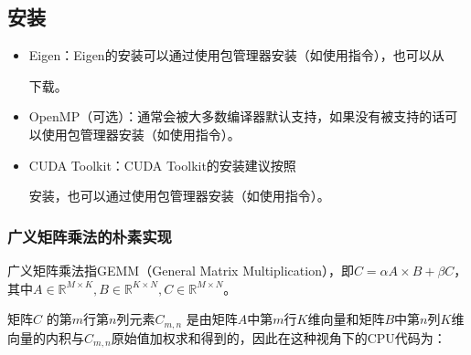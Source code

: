 \documentclass[letterpaper,10pt,english]{sphinxmanual}
\begin{document}
\subsection{安装}
\label{\detokenize{chapter_accelerator/accelerator_practise:id2}}\begin{itemize}
\item {} 
\sphinxAtStartPar
Eigen：Eigen的安装可以通过使用包管理器安装（如使用指令），也可以从%
\begin{footnote}[24]\sphinxAtStartFootnote
{}
%
\end{footnote}下载。

\item {} 
\sphinxAtStartPar
OpenMP（可选）：通常会被大多数编译器默认支持，如果没有被支持的话可以使用包管理器安装（如使用指令）。

\item {} 
\sphinxAtStartPar
CUDA Toolkit：CUDA
Toolkit的安装建议按照%
\begin{footnote}[25]\sphinxAtStartFootnote
{}
%
\end{footnote}安装，也可以通过使用包管理器安装（如使用指令）。

\end{itemize}


\subsubsection{广义矩阵乘法的朴素实现}
\label{\detokenize{chapter_accelerator/accelerator_practise:sec-accelerator-naive}}\label{\detokenize{chapter_accelerator/accelerator_practise:id3}}
\sphinxAtStartPar
广义矩阵乘法指GEMM（General Matrix
Multiplication），即\(C = \alpha A\times B + \beta C\)，其中\(A\in\mathbb{R}^{M\times K}, B\in\mathbb{R}^{K\times N}, C\in\mathbb{R}^{M\times N}\)。

\sphinxAtStartPar
矩阵\(C\)
的第\(m\)行第\(n\)列元素\(C_{m, n}\)
是由矩阵\(A\)中第\(m\)行\(K\)维向量和矩阵\(B\)中第\(n\)列\(K\)维向量的内积与\(C_{m, n}\)原始值加权求和得到的，因此在这种视角下的CPU代码为：
\end{document}
